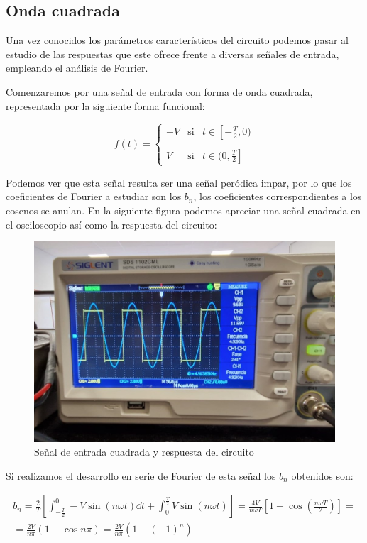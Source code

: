 \documentclass[a4paper,12pt,titlepage]{article}
\begin{document}
\subsection{Onda cuadrada}

Una vez conocidos los parámetros característicos del circuito podemos pasar al estudio de las respuestas que este ofrece frente a diversas señales de entrada, empleando el análisis de Fourier.

Comenzaremos por una señal de entrada con forma de onda cuadrada, representada por la siguiente forma funcional:

\begin{equation}
    f(t) = \left\{ \begin{array}{ccc}
        -V & \text{si} & t\in \left[-\frac{T}{2},0)\right. \\ \\
        V & \text{si} & t\in \left.(0,\frac{T}{2}\right]
    \end{array} \right.
\end{equation}

Podemos ver que esta señal resulta ser una señal peródica impar, por lo que los coeficientes de Fourier a estudiar son los $b_n$, los coeficientes correspondientes a los cosenos se anulan. En la siguiente figura podemos apreciar una señal cuadrada en el osciloscopio así como la respuesta del circuito:

\begin{figure}[h!]
    \centering
    \includegraphics[width=0.6\linewidth]{fourier/onda cuadrada/cuadrada1.jpg}
    \caption{Señal de entrada cuadrada y respuesta del circuito}
    \label{arm1_c}
\end{figure}

Si realizamos el desarrollo en serie de Fourier de esta señal los $b_n$ obtenidos son:

\begin{equation}
    \begin{gathered}
        b_n = \frac{2}{T} \left[ \int_{-\frac{T}{2}}^0 -V\sin (n\omega t) \dd t + \int_0^{\frac{T}{2}} V\sin (n\omega t)\right] = \frac{4V}{n\omega T} \left[1 - \cos \left(\frac{n\omega T}{2}\right)\right] = \\
        = \frac{2V}{n\pi} (1-\cos n\pi) = \frac{2V}{n\pi} (1-(-1)^n)
    \end{gathered}
\end{equation}
\end{document}

